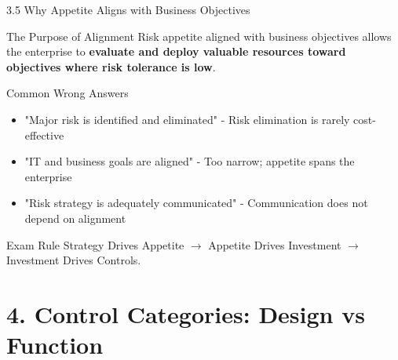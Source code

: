 \documentclass{beamer}
\begin{document}
	\begin{frame}{3.5 Why Appetite Aligns with Business Objectives}
		\begin{block}{The Purpose of Alignment}
			Risk appetite aligned with business objectives allows the enterprise to \textbf{evaluate and deploy valuable resources toward objectives where risk tolerance is low}.
		\end{block}
		
		\begin{alertblock}{Common Wrong Answers}
			\begin{itemize}
				\item "Major risk is identified and eliminated" - Risk elimination is rarely cost-effective
				\item "IT and business goals are aligned" - Too narrow; appetite spans the enterprise
				\item "Risk strategy is adequately communicated" - Communication does not depend on alignment
			\end{itemize}
		\end{alertblock}
		
		\begin{exampleblock}{Exam Rule}
			Strategy Drives Appetite $\rightarrow$ Appetite Drives Investment $\rightarrow$ Investment Drives Controls.
		\end{exampleblock}
	\end{frame}
	
	\section{4. Control Categories: Design vs Function}
	
\end{document}
